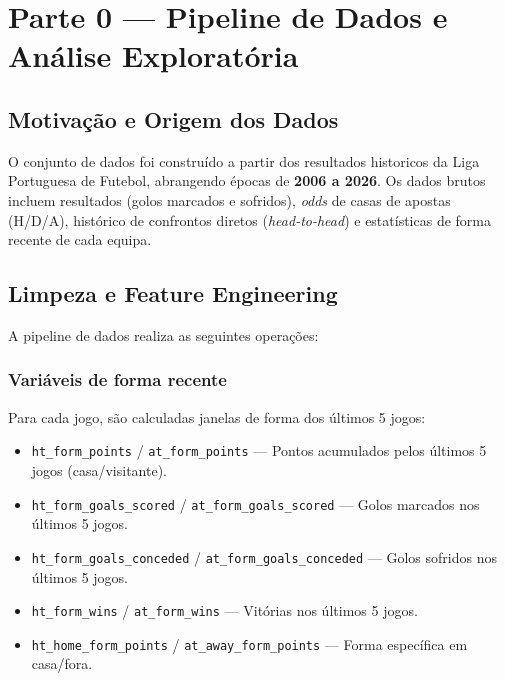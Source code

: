 \documentclass[12pt, a4paper]{article}
\begin{document}
\section{Parte 0 --- Pipeline de Dados e Análise Exploratória}

\subsection{Motivação e Origem dos Dados}

O conjunto de dados foi construído a partir dos resultados historicos da Liga Portuguesa de Futebol, abrangendo épocas de \textbf{2006 a 2026}. Os dados brutos incluem resultados (golos marcados e sofridos), \textit{odds} de casas de apostas (H/D/A), histórico de confrontos diretos (\textit{head-to-head}) e estatísticas de forma recente de cada equipa.

\subsection{Limpeza e Feature Engineering}

A pipeline de dados realiza as seguintes operações:

\subsubsection{Variáveis de forma recente}

Para cada jogo, são calculadas janelas de forma dos últimos 5 jogos:

\begin{itemize}
  \item \texttt{ht\_form\_points} / \texttt{at\_form\_points} — Pontos acumulados pelos últimos 5 jogos (casa/visitante).
  \item \texttt{ht\_form\_goals\_scored} / \texttt{at\_form\_goals\_scored} — Golos marcados nos últimos 5 jogos.
  \item \texttt{ht\_form\_goals\_conceded} / \texttt{at\_form\_goals\_conceded} — Golos sofridos nos últimos 5 jogos.
  \item \texttt{ht\_form\_wins} / \texttt{at\_form\_wins} — Vitórias nos últimos 5 jogos.
  \item \texttt{ht\_home\_form\_points} / \texttt{at\_away\_form\_points} — Forma específica em casa/fora.
\end{itemize}
\end{document}
